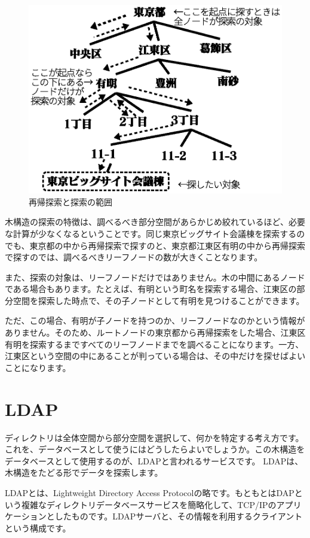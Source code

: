 \begin{figure}[htbp]
	\includegraphics[width=12cm,clip]{draw/recursive.eps}
	\caption{再帰探索と探索の範囲}
	\label{fig:recursive}
\end{figure}

木構造の探索の特徴は、調べるべき部分空間があらかじめ絞れているほど、必要な計算が少なくなるということです。同じ東京ビッグサイト会議棟を探索するのでも、東京都の中から再帰探索で探すのと、東京都江東区有明の中から再帰探索で探すのでは、調べるべきリーフノードの数が大きくことなります。

また、探索の対象は、リーフノードだけではありません。木の中間にあるノードである場合もあります。たとえば、有明という町名を探索する場合、江東区の部分空間を探索した時点で、その子ノードとして有明を見つけることができます。

ただ、この場合、有明が子ノードを持つのか、リーフノードなのかという情報がありません。そのため、ルートノードの東京都から再帰探索をした場合、江東区有明を探索するまですべてのリーフノードまでを調べることになります。一方、江東区という空間の中にあることが判っている場合は、その中だけを探せばよいことになります。

\section{LDAP}

ディレクトリは全体空間から部分空間を選択して、何かを特定する考え方です。これを、データベースとして使うにはどうしたらよいでしょうか。この木構造をデータベースとして使用するのが、LDAPと言われるサービスです。
LDAPは、木構造をたどる形でデータを探索します。

LDAPとは、Lightweight Directory Access Protocolの略です。もともとはDAPという複雑なディレクトリデータベースサービスを簡略化して、TCP/IPのアプリケーションとしたものです。LDAPサーバと、その情報を利用するクライアントという構成です。

